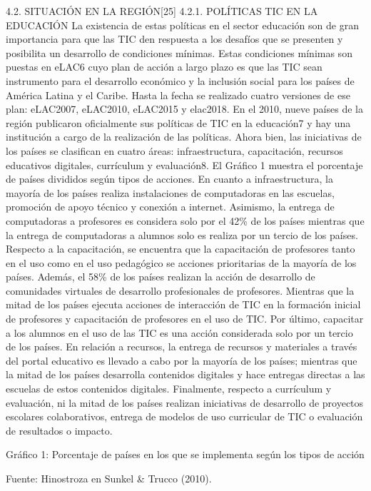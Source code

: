 4.2. SITUACIÓN EN LA REGIÓN{[}25{]} 4.2.1. POLÍTICAS TIC EN LA EDUCACIÓN
La existencia de estas políticas en el sector educación son de gran
importancia para que las TIC den respuesta a los desafíos que se
presenten y posibilita un desarrollo de condiciones mínimas. Estas
condiciones mínimas son puestas en eLAC6 cuyo plan de acción a largo
plazo es que las TIC sean instrumento para el desarrollo económico y la
inclusión social para los países de América Latina y el Caribe. Hasta la
fecha se realizado cuatro versiones de ese plan: eLAC2007, eLAC2010,
eLAC2015 y elac2018. En el 2010, nueve países de la región publicaron
oficialmente sus políticas de TIC en la educación7 y hay una institución
a cargo de la realización de las políticas. Ahora bien, las iniciativas
de los países se clasifican en cuatro áreas: infraestructura,
capacitación, recursos educativos digitales, currículum y evaluación8.
El Gráfico 1 muestra el porcentaje de países divididos según tipos de
acciones. En cuanto a infraestructura, la mayoría de los países realiza
instalaciones de computadoras en las escuelas, promoción de apoyo
técnico y conexión a internet. Asimismo, la entrega de computadoras a
profesores es considera solo por el 42\% de los países mientras que la
entrega de computadoras a alumnos solo es realiza por un tercio de los
países. Respecto a la capacitación, se encuentra que la capacitación de
profesores tanto en el uso como en el uso pedagógico se acciones
prioritarias de la mayoría de los países. Además, el 58\% de los países
realizan la acción de desarrollo de comunidades virtuales de desarrollo
profesionales de profesores. Mientras que la mitad de los países ejecuta
acciones de interacción de TIC en la formación inicial de profesores y
capacitación de profesores en el uso de TIC. Por último, capacitar a los
alumnos en el uso de las TIC es una acción considerada solo por un
tercio de los países. En relación a recursos, la entrega de recursos y
materiales a través del portal educativo es llevado a cabo por la
mayoría de los países; mientras que la mitad de los países desarrolla
contenidos digitales y hace entregas directas a las escuelas de estos
contenidos digitales. Finalmente, respecto a currículum y evaluación, ni
la mitad de los países realizan iniciativas de desarrollo de proyectos
escolares colaborativos, entrega de modelos de uso curricular de TIC o
evaluación de resultados o impacto.

Gráfico 1: Porcentaje de países en los que se implementa según los tipos
de acción

Fuente: Hinostroza en Sunkel \& Trucco (2010).

